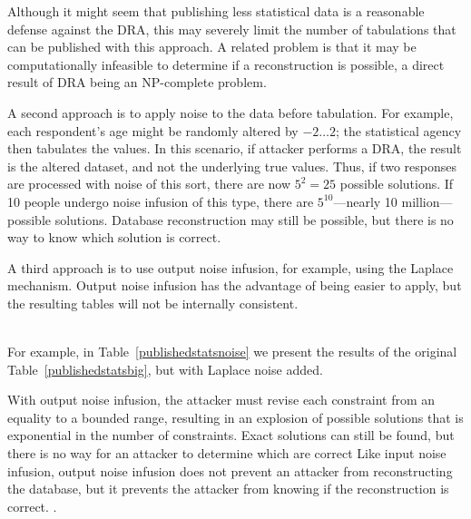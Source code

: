 \documentclass[runningheads]{llncs}
\newif\ifshortversion
\newif\iflongversion
\begin{document}
Although it might seem that publishing less statistical data is a
reasonable defense against the DRA, this may severely limit the number
of tabulations that can be published with this approach. A
related problem is that it may be computationally infeasible to
determine if a reconstruction is possible, a direct result of DRA being an NP-complete
problem. \iflongversion That is, the inability of a SAT
solver to find a solution to a SAT problem does not mean that a
solution is not possible---it may just mean that the attacker hasn't waited
long enough.\fi

A second approach is to apply noise to the data before
tabulation. For example, each respondent's age might be randomly altered by $-2 \ldots 2$; 
the statistical agency then tabulates the values. 
In this scenario, if attacker performs a DRA, the result is the altered dataset, and not the underlying true values. Thus, if two responses
are processed with noise of this sort, there are now $5^2 = 25$
possible solutions. If 10 people undergo noise infusion of this type,
there are $5^{10}$---nearly 10 million---possible
solutions. Database reconstruction may still be possible, but there is no
way to know which solution is correct.

A third approach is to use output noise infusion, for example, using
the Laplace mechanism\cite{Dwork:2006:CNS:2180286.2180305}. Output
noise infusion has the advantage of being easier to apply, but the resulting tables will not be internally consistent.
\ifshortversion
The rightmost column of Table~\ref{publishedstatsbig} shows the results of output noise infusion.
\else
\\
For example, in Table~\ref{publishedstatsnoise} we present the results
of the original Table~\ref{publishedstatsbig}, but with Laplace noise
added.  
\fi
With output noise infusion, the attacker must revise each constraint from an equality to a bounded range, resulting in an explosion of possible solutions that is exponential in the number of constraints. Exact solutions can still be found, but there is no way for an attacker to determine which are correct
 Like input noise infusion, output noise infusion does not prevent an attacker from reconstructing the database, but it prevents the attacker from knowing if the reconstruction is correct. .
\end{document}
